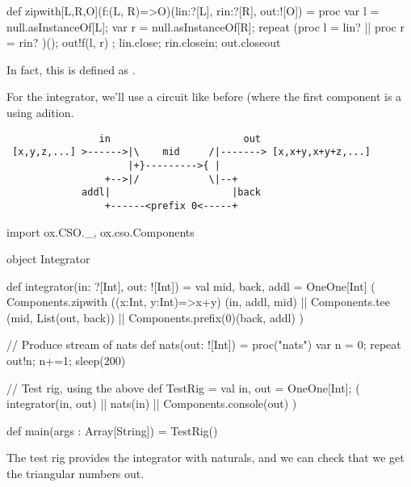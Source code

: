 \begin{nontuteanswer} 
\begin{scala}
def zipwith[L,R,O](f:(L, R)=>O)(lin:?[L], rin:?[R], out:![O]) = proc{
  var l = null.asInstanceOf[L]; 
  var r = null.asInstanceOf[R];
  repeat { 
    (proc { l = lin? } || proc { r = rin? })(); 
    out!f(l, r) 
  };   
  lin.close; rin.closein; out.closeout
}
\end{scala}
%
In fact, this is defined as .

For the integrator, we'll use a circuit like before (where the first component
is a  using adition.
%
\begin{verbatim}
                in                       out
 [x,y,z,...] >------>|\    mid     /|-------> [x,x+y,x+y+z,...]
                     |+}--------->{ |
                 +-->|/            \|--+
             addl|                     |back
                 +------<prefix 0<-----+
\end{verbatim}
%
\begin{scala}
import ox.CSO._, ox.cso.Components

object Integrator{

  def integrator(in: ?[Int], out: ![Int]) = {
    val mid, back, addl = OneOne[Int]
    (  Components.zipwith ((x:Int, y:Int)=>x+y) (in, addl, mid)
    || Components.tee (mid, List(out, back))
    || Components.prefix(0)(back, addl)
    )
  }

  // Produce stream of nats
  def nats(out: ![Int]) = proc("nats"){
    var n = 0;
    repeat{ out!n; n+=1; sleep(200) }
  }

  // Test rig, using the above
  def TestRig = {
    val in, out = OneOne[Int];
    ( integrator(in, out) || nats(in) || Components.console(out) )
  }

  def main(args : Array[String]) = TestRig()
}
\end{scala}
The test rig provides the integrator with naturals, and we can check that we
get the triangular numbers out.
\end{nontuteanswer}
